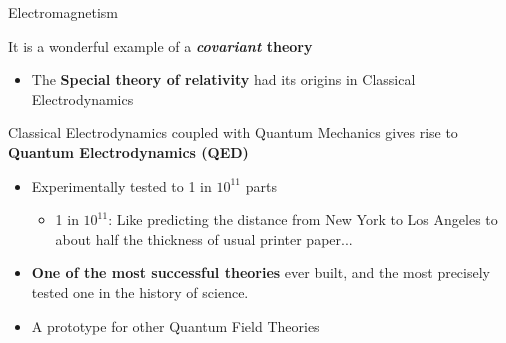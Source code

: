 \begin{frame}{Electromagnetism}

It is a wonderful example of a {\bf {\em covariant} theory}
\begin{itemize}
  \item The {\bf Special theory of relativity} had its origins in Classical Electrodynamics
\end{itemize}

\vspace{0.2cm}

Classical Electrodynamics coupled with Quantum Mechanics gives rise to {\bf Quantum Electrodynamics (QED)}
\begin{itemize}
  \item Experimentally tested to 1 in $10^{11}$ parts
  \begin{itemize}
     \item 1 in $10^{11}$: Like predicting the distance from New York to Los Angeles to about half the thickness of usual printer paper...
  \end{itemize}
  \item {\bf One of the most successful theories} ever built, and the most precisely tested one in the history of science.
  \item A prototype for other Quantum Field Theories
\end{itemize}

\end{frame}
